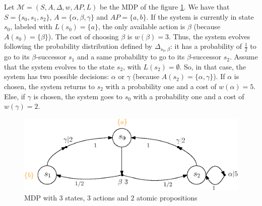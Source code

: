 \begin{example}\label{simple-mdp}
  Let $\mathcal{M} = (S, A, \Delta, w, AP, L)$ be the MDP of the figure \ref{mdp01}. We have that $S = \{s_0, s_1, s_2\}$, $A = \{\alpha, \beta, \gamma\}$ and $AP=\{a, b\}$. If the system is currently in state $s_0$, labeled with $L(s_0) = \{a\}$, the only available action is $\beta$ (because $A(s_0) = \{\beta\}$).
  The cost of choosing $\beta$ is $w(\beta) = 3$.
  Thus, the system evolves following the probability distribution defined by $\Delta_{s_0, \beta}$: it has a probability of $\frac{1}{2}$
  to go to its $\beta$-successor $s_1$ and a same probability to go to its $\beta$-successor $s_2$. Assume that the system evolves to the state $s_2$, with $L(s_2) = \emptyset$. So, in that case, the system has two possible decisions: $\alpha$ or $\gamma$ (because $A(s_2) = \{\alpha, \gamma\}$). If $\alpha$ is chosen, the system returns to $s_2$ with a probability one and a cost of $w(\alpha) = 5$. Else, if $\gamma$ is chosen, the system goes to $s_0$ with a probability one and a cost of $w(\gamma) = 2$.
  \begin{figure}[h!]
    \centering
    \includegraphics[width=0.7\linewidth]{resources/simple-mdp}
    \caption{MDP with $3$ states, $3$ actions and $2$ atomic propositions}\label{mdp01}
  \end{figure}
\end{example}

